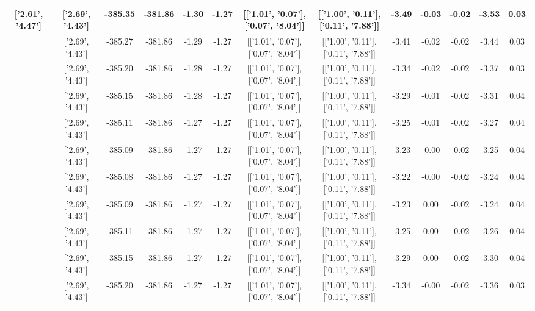 \begin{table}[htbp]
\begin{adjustbox}{angle=90}
\begin{tabular}{|c|c|c|c|c|c|c|c|c|c|c|c|c|}
 ['2.61', '4.47'] & ['2.69', '4.43'] & -385.35 & -381.86 & -1.30 & -1.27 & [['1.01', '0.07'], ['0.07', '8.04']] & [['1.00', '0.11'], ['0.11', '7.88']] & -3.49 & -0.03 & -0.02 & -3.53 & 0.03\\ \hline
 ['2.63', '4.47'] & ['2.69', '4.43'] & -385.27 & -381.86 & -1.29 & -1.27 & [['1.01', '0.07'], ['0.07', '8.04']] & [['1.00', '0.11'], ['0.11', '7.88']] & -3.41 & -0.02 & -0.02 & -3.44 & 0.03\\ \hline
 ['2.64', '4.46'] & ['2.69', '4.43'] & -385.20 & -381.86 & -1.28 & -1.27 & [['1.01', '0.07'], ['0.07', '8.04']] & [['1.00', '0.11'], ['0.11', '7.88']] & -3.34 & -0.02 & -0.02 & -3.37 & 0.03\\ \hline
 ['2.65', '4.45'] & ['2.69', '4.43'] & -385.15 & -381.86 & -1.28 & -1.27 & [['1.01', '0.07'], ['0.07', '8.04']] & [['1.00', '0.11'], ['0.11', '7.88']] & -3.29 & -0.01 & -0.02 & -3.31 & 0.04\\ \hline
 ['2.66', '4.45'] & ['2.69', '4.43'] & -385.11 & -381.86 & -1.27 & -1.27 & [['1.01', '0.07'], ['0.07', '8.04']] & [['1.00', '0.11'], ['0.11', '7.88']] & -3.25 & -0.01 & -0.02 & -3.27 & 0.04\\ \hline
 ['2.68', '4.44'] & ['2.69', '4.43'] & -385.09 & -381.86 & -1.27 & -1.27 & [['1.01', '0.07'], ['0.07', '8.04']] & [['1.00', '0.11'], ['0.11', '7.88']] & -3.23 & -0.00 & -0.02 & -3.25 & 0.04\\ \hline
 ['2.69', '4.43'] & ['2.69', '4.43'] & -385.08 & -381.86 & -1.27 & -1.27 & [['1.01', '0.07'], ['0.07', '8.04']] & [['1.00', '0.11'], ['0.11', '7.88']] & -3.22 & -0.00 & -0.02 & -3.24 & 0.04\\ \hline
 ['2.70', '4.43'] & ['2.69', '4.43'] & -385.09 & -381.86 & -1.27 & -1.27 & [['1.01', '0.07'], ['0.07', '8.04']] & [['1.00', '0.11'], ['0.11', '7.88']] & -3.23 & 0.00 & -0.02 & -3.24 & 0.04\\ \hline
 ['2.71', '4.42'] & ['2.69', '4.43'] & -385.11 & -381.86 & -1.27 & -1.27 & [['1.01', '0.07'], ['0.07', '8.04']] & [['1.00', '0.11'], ['0.11', '7.88']] & -3.25 & 0.00 & -0.02 & -3.26 & 0.04\\ \hline
 ['2.73', '4.42'] & ['2.69', '4.43'] & -385.15 & -381.86 & -1.27 & -1.27 & [['1.01', '0.07'], ['0.07', '8.04']] & [['1.00', '0.11'], ['0.11', '7.88']] & -3.29 & 0.00 & -0.02 & -3.30 & 0.04\\ \hline
 ['2.74', '4.41'] & ['2.69', '4.43'] & -385.20 & -381.86 & -1.27 & -1.27 & [['1.01', '0.07'], ['0.07', '8.04']] & [['1.00', '0.11'], ['0.11', '7.88']] & -3.34 & -0.00 & -0.02 & -3.36 & 0.03\\ \hline

\end{tabular}
\end{adjustbox}
\end{table}
